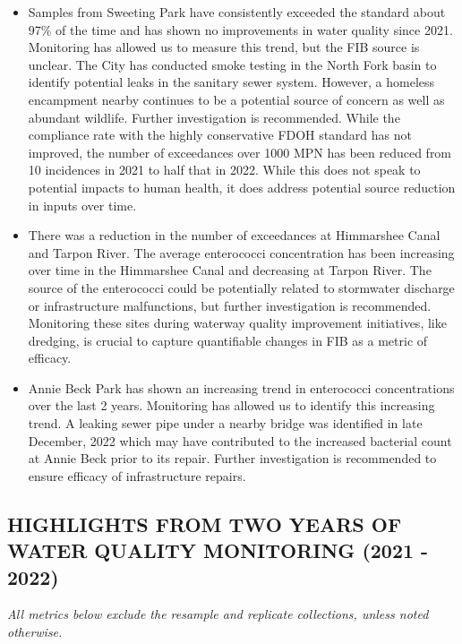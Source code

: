 \documentclass[
]{article}
\begin{document}
\begin{itemize}
\item
  Samples from Sweeting Park have consistently exceeded the standard
  about 97\% of the time and has shown no improvements in water quality
  since 2021. Monitoring has allowed us to measure this trend, but the
  FIB source is unclear. The City has conducted smoke testing in the
  North Fork basin to identify potential leaks in the sanitary sewer
  system. However, a homeless encampment nearby continues to be a
  potential source of concern as well as abundant wildlife. Further
  investigation is recommended. While the compliance rate with the
  highly conservative FDOH standard has not improved, the number of
  exceedances over 1000 MPN has been reduced from 10 incidences in 2021
  to half that in 2022. While this does not speak to potential impacts
  to human health, it does address potential source reduction in inputs
  over time.
\item
  There was a reduction in the number of exceedances at Himmarshee Canal
  and Tarpon River. The average enterococci concentration has been
  increasing over time in the Himmarshee Canal and decreasing at Tarpon
  River. The source of the enterococci could be potentially related to
  stormwater discharge or infrastructure malfunctions, but further
  investigation is recommended. Monitoring these sites during waterway
  quality improvement initiatives, like dredging, is crucial to capture
  quantifiable changes in FIB as a metric of efficacy.
\item
  Annie Beck Park has shown an increasing trend in enterococci
  concentrations over the last 2 years. Monitoring has allowed us to
  identify this increasing trend. A leaking sewer pipe under a nearby
  bridge was identified in late December, 2022 which may have
  contributed to the increased bacterial count at Annie Beck prior to
  its repair. Further investigation is recommended to ensure efficacy of
  infrastructure repairs.
\end{itemize}

\hypertarget{highlights-from-two-years-of-water-quality-monitoring-2021---2022}{%
\subsection{HIGHLIGHTS FROM TWO YEARS OF WATER QUALITY MONITORING (2021
-
2022)}\label{highlights-from-two-years-of-water-quality-monitoring-2021---2022}}

\emph{All metrics below exclude the resample and replicate collections,
unless noted otherwise.}
\end{document}
